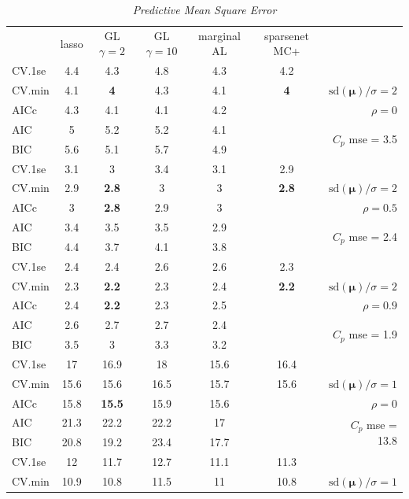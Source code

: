 \documentclass[12pt]{article}
\newcommand{\mr}[1]{\mathrm{#1}}
\newcommand{\bm}[1]{\mathbf{#1}}
\begin{document}
\begin{table}[p]\vspace{-.5cm}
\caption[l]{\it Predictive Mean Square Error\hfill}
\vspace{-.5cm}
\small{}
\begin{center}
\begin{tabular}{l*{5}{c}|r}
 & lasso & GL $\gamma=2$ & GL $\gamma=10$ & marginal AL & sparsenet MC+  &  \\
\cline{1-7}
CV.1se & 4.4 & 4.3 & 4.8 & 4.3 & 4.2 &\\
CV.min & 4.1 & {\bf 4} & 4.3 & 4.1 & {\bf 4} &  $\mr{sd}(\bm{\mu})/\sigma=2$ \\
AICc & 4.3 & 4.1 & 4.1 & 4.2 & & $\rho=0$ \\
AIC & 5 & 5.2 & 5.2 & 4.1 & & \multirow{2}{*}{$C_p$ mse = 3.5} \\
BIC & 5.6 & 5.1 & 5.7 & 4.9 & & \\
 \hline 
CV.1se & 3.1 & 3 & 3.4 & 3.1 & 2.9 &\\
CV.min & 2.9 & {\bf 2.8} & 3 & 3 & {\bf 2.8} &  $\mr{sd}(\bm{\mu})/\sigma=2$ \\
AICc & 3 & {\bf 2.8} & 2.9 & 3 & & $\rho=0.5$ \\
AIC & 3.4 & 3.5 & 3.5 & 2.9 & & \multirow{2}{*}{$C_p$ mse = 2.4} \\
BIC & 4.4 & 3.7 & 4.1 & 3.8 & & \\
 \hline 
CV.1se & 2.4 & 2.4 & 2.6 & 2.6 & 2.3 &\\
CV.min & 2.3 & {\bf 2.2} & 2.3 & 2.4 & {\bf 2.2} &  $\mr{sd}(\bm{\mu})/\sigma=2$ \\
AICc & 2.4 & {\bf 2.2} & 2.3 & 2.5 & & $\rho=0.9$ \\
AIC & 2.6 & 2.7 & 2.7 & 2.4 & & \multirow{2}{*}{$C_p$ mse = 1.9} \\
BIC & 3.5 & 3 & 3.3 & 3.2 & & \\
 \hline 
CV.1se & 17 & 16.9 & 18 & 15.6 & 16.4 &\\
CV.min & 15.6 & 15.6 & 16.5 & 15.7 & 15.6 &  $\mr{sd}(\bm{\mu})/\sigma=1$ \\
AICc & 15.8 & {\bf 15.5} & 15.9 & 15.6 & & $\rho=0$ \\
AIC & 21.3 & 22.2 & 22.2 & 17 & & \multirow{2}{*}{$C_p$ mse = 13.8} \\
BIC & 20.8 & 19.2 & 23.4 & 17.7 & & \\
 \hline 
CV.1se & 12 & 11.7 & 12.7 & 11.1 & 11.3 &\\
CV.min & 10.9 & 10.8 & 11.5 & 11 & 10.8 &  $\mr{sd}(\bm{\mu})/\sigma=1$ \\

\end{tabular}
\end{center}
\end{table}
\end{document}
